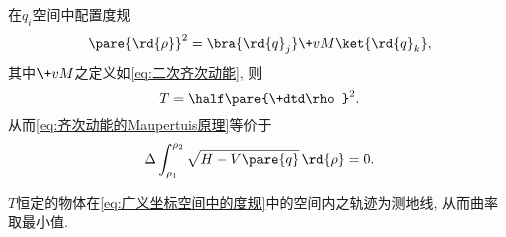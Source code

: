 \documentclass[../TheoreticalMechanics.tex]{subfiles}
\begin{document}
\begin{finale}
    \begin{theorem}[Jacobi最小作用量原理]
        在$q_i$空间中配置度规
        \begin{equation}
            \label{eq:广义坐标空间中的度规}
            \pare{\rd{\rho}}^2 = \bra{\rd{q}_j}\+vM\ket{\rd{q}_k}, 
        \end{equation}
        其中$\+vM$之定义如\eqref{eq:二次齐次动能}, 则
        \[ T = \half\pare{\+dtd\rho}^2. \]
        从而\eqref{eq:齐次动能的Maupertuis原理}等价于
        \[ \Delta\int_{\rho_1}^{\rho_2} \sqrt{H - V\pare{q}}\,\rd{\rho} = 0. \]
    \end{theorem}
\end{finale}
\begin{corollary}[Hertz原理]
    $T$恒定的物体在\eqref{eq:广义坐标空间中的度规}中的空间内之轨迹为测地线, 从而曲率取最小值.
\end{corollary}



\end{document}
